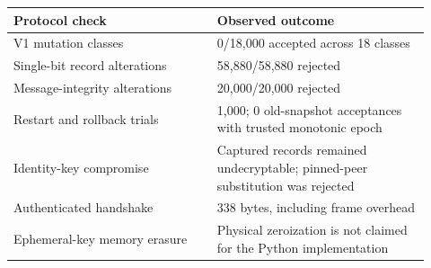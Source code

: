 \begin{tabular}{p{0.45\linewidth}p{0.47\linewidth}}
\toprule
\textbf{Protocol check} & \textbf{Observed outcome} \\
\midrule
V1 mutation classes & 0/18,000 accepted across 18 classes \\
Single-bit record alterations & 58,880/58,880 rejected \\
Message-integrity alterations & 20,000/20,000 rejected \\
Restart and rollback trials & 1,000; 0 old-snapshot acceptances with trusted monotonic epoch \\
Identity-key compromise & Captured records remained undecryptable; pinned-peer substitution was rejected \\
Authenticated handshake & 338 bytes, including frame overhead \\
Ephemeral-key memory erasure & Physical zeroization is not claimed for the Python implementation \\
\bottomrule
\end{tabular}
